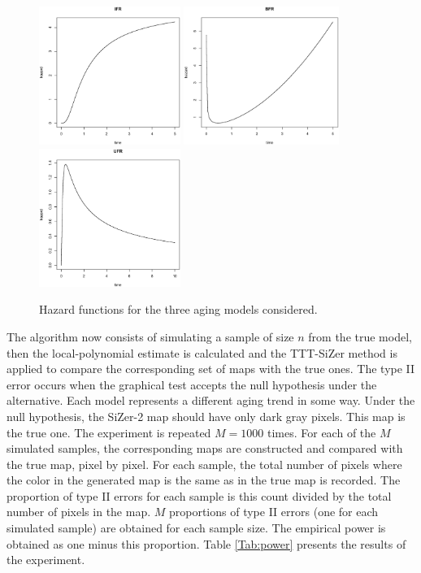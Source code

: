 \documentclass[preprint,12pt]{elsarticle}
\begin{document}
\begin{figure}[h]\centering
        \includegraphics[height=4.5cm]{Fig6_1_IFRmodel}%
				\includegraphics[height=4.5cm]{Fig6_2_BFRmodel}%
				\includegraphics[height=4.5cm]{Fig6_3_UFRmodel}%
\caption{{Hazard functions for the three aging models considered}.} \label{models}
\end{figure}

The algorithm now consists of simulating a sample of size $n$ from the true model, then  the local-polynomial estimate is calculated and the TTT-SiZer method is applied to compare the corresponding set of maps with the true ones.
The type II error occurs when the graphical test accepts the null hypothesis under the alternative. Each model represents a different  aging trend in some way. Under the null  hypothesis, the SiZer-2 map  should have only dark gray pixels. This map is the true one. The experiment is repeated $M=1000$ times.  For each of the $M$ simulated samples,  the corresponding maps are constructed and compared with the true map, pixel by pixel. For each sample, the total number of pixels where the color in the generated map is  the same as in the true map is recorded. The proportion of type II errors for each sample is this count divided by the total number of pixels in the map. $M$ proportions of type II errors (one for each simulated sample) are obtained for each sample size. The empirical power is obtained as one minus this proportion. Table \ref{Tab:power} presents the results of the experiment.
\end{document}
